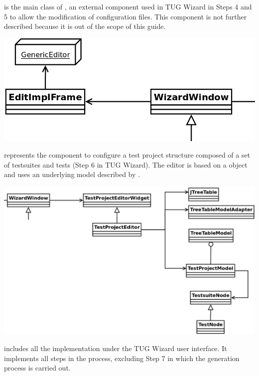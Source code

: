  is the main class of , an
external component used in TUG Wizard in Steps 4 and 5 to allow the
modification of configuration files. This component is not further
described because it is out of the scope of this guide.


\vspace{2ex}
\begin{center}
\includegraphics[width=.65\textwidth]{images/diag/tug_wizard_classdiag_ww1.png}
\end{center}
\vspace{2ex}


 represents the component to configure a
test project structure composed of a set of testsuites and tests (Step 6 in
TUG Wizard). The editor is based on a  object and uses an
underlying model described by .


\vspace{2ex}
\begin{center}
\includegraphics[width=.99\textwidth]{images/diag/tug_wizard_classdiag_ww2.png}
\end{center}
\vspace{2ex}



 includes all the implementation under the TUG
Wizard user interface. It implements all steps in the process, excluding
Step 7 in which the generation process is carried out.

